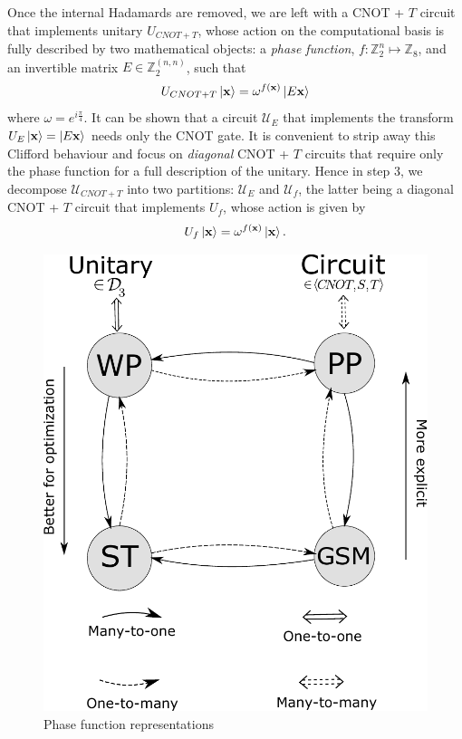\documentclass[notitlepage]{article}
\theoremstyle{definition}
\theoremstyle{problem}
\theoremstyle{lemma}
\begin{document}
Once the internal Hadamards are removed, we are left with a CNOT + $T$ circuit 
that implements unitary $U_{CNOT+T}$, whose action on the computational basis is fully described by two mathematical objects: a \emph{phase function}, $f: \mathbb{Z}_2^n \mapsto \mathbb{Z}_8$, and an invertible matrix $E \in \mathbb{Z}_2^{(n,n)}$, such that
\begin{equation}
U_{CNOT+T}\left\vert{\mathbf{x}}\right\rangle = \omega^{f(\mathbf{x})}\left\vert{E\mathbf{x}}\right\rangle
\end{equation}
where $\omega = e^{i\frac{\pi}{4}}$. It can be shown that a circuit $\mathcal{U}_E$ that implements the transform $U_E\left\vert{\mathbf{x}}\right\rangle=\left\vert{E\mathbf{x}}\right\rangle$ needs only the CNOT gate. It is convenient to strip away this Clifford behaviour and focus on \emph{diagonal} CNOT + $T$ circuits that require only the phase function for a full description of the unitary.
Hence in step 3, we decompose $\mathcal{U}_{CNOT+T}$ into two partitions: $\mathcal{U}_E$ and $\mathcal{U}_f$, the latter being a diagonal CNOT + $T$ circuit that implements $U_f$, whose action is given by
\begin{equation}
\label{e_U_f_wo}
U_f\left\vert{\mathbf{x}}\right\rangle = \omega^{f(\mathbf{x})}\left\vert{\mathbf{x}}\right\rangle.
\end{equation}

\begin{figure}
	\centering
	\includegraphics[width=1\linewidth]{maprep}
	\caption{Phase function representations}
	\label{fig_maprep}
\end{figure}
\end{document}
